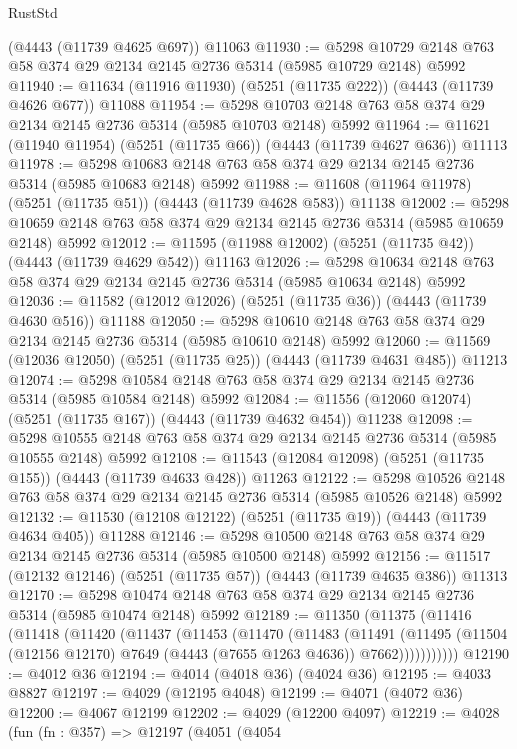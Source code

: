 \begin{lexlean}{RustStd}
\begin{coremodule}
    (@4443 (@11739 @4625 @697))
    @11063
@11930 := @5298 @10729 @2148 @763 @58 @374 @29 @2134 @2145 @2736 @5314 (@5985 @10729 @2148) @5992
@11940 := @11634 (@11916 @11930) (@5251 (@11735 @222)) (@4443 (@11739 @4626 @677)) @11088
@11954 := @5298 @10703 @2148 @763 @58 @374 @29 @2134 @2145 @2736 @5314 (@5985 @10703 @2148) @5992
@11964 := @11621 (@11940 @11954) (@5251 (@11735 @66)) (@4443 (@11739 @4627 @636)) @11113
@11978 := @5298 @10683 @2148 @763 @58 @374 @29 @2134 @2145 @2736 @5314 (@5985 @10683 @2148) @5992
@11988 := @11608 (@11964 @11978) (@5251 (@11735 @51)) (@4443 (@11739 @4628 @583)) @11138
@12002 := @5298 @10659 @2148 @763 @58 @374 @29 @2134 @2145 @2736 @5314 (@5985 @10659 @2148) @5992
@12012 := @11595 (@11988 @12002) (@5251 (@11735 @42)) (@4443 (@11739 @4629 @542)) @11163
@12026 := @5298 @10634 @2148 @763 @58 @374 @29 @2134 @2145 @2736 @5314 (@5985 @10634 @2148) @5992
@12036 := @11582 (@12012 @12026) (@5251 (@11735 @36)) (@4443 (@11739 @4630 @516)) @11188
@12050 := @5298 @10610 @2148 @763 @58 @374 @29 @2134 @2145 @2736 @5314 (@5985 @10610 @2148) @5992
@12060 := @11569 (@12036 @12050) (@5251 (@11735 @25)) (@4443 (@11739 @4631 @485)) @11213
@12074 := @5298 @10584 @2148 @763 @58 @374 @29 @2134 @2145 @2736 @5314 (@5985 @10584 @2148) @5992
@12084 := @11556 (@12060 @12074) (@5251 (@11735 @167)) (@4443 (@11739 @4632 @454)) @11238
@12098 := @5298 @10555 @2148 @763 @58 @374 @29 @2134 @2145 @2736 @5314 (@5985 @10555 @2148) @5992
@12108 := @11543 (@12084 @12098) (@5251 (@11735 @155)) (@4443 (@11739 @4633 @428)) @11263
@12122 := @5298 @10526 @2148 @763 @58 @374 @29 @2134 @2145 @2736 @5314 (@5985 @10526 @2148) @5992
@12132 := @11530 (@12108 @12122) (@5251 (@11735 @19)) (@4443 (@11739 @4634 @405)) @11288
@12146 := @5298 @10500 @2148 @763 @58 @374 @29 @2134 @2145 @2736 @5314 (@5985 @10500 @2148) @5992
@12156 := @11517 (@12132 @12146) (@5251 (@11735 @57)) (@4443 (@11739 @4635 @386)) @11313
@12170 := @5298 @10474 @2148 @763 @58 @374 @29 @2134 @2145 @2736 @5314 (@5985 @10474 @2148) @5992
@12189 := @11350
    (@11375
      (@11416
        (@11418
          (@11420
            (@11437
              (@11453
                (@11470
                  (@11483
                    (@11491
                      (@11495
                        (@11504 (@12156 @12170) @7649 (@4443 (@7655 @1263 @4636)) @7662)))))))))))
@12190 := @4012 @36
@12194 := @4014 (@4018 @36) (@4024 @36)
@12195 := @4033 @8827
@12197 := @4029 (@12195 @4048)
@12199 := @4071 (@4072 @36)
@12200 := @4067 @12199
@12202 := @4029 (@12200 @4097)
@12219 := @4028
    (fun (fn : @357) =>
    @12197
      (@4051
        (@4054

\end{coremodule}
\end{lexlean}
